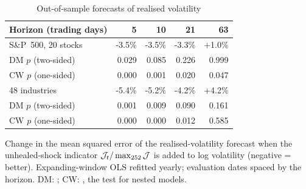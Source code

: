 \begin{table}[p]\centering\small
\caption{Out-of-sample forecasts of realised volatility}\label{tab:h7}
\begin{tabular}{@{}lrrrr@{}}\toprule
Horizon (trading days) & 5 & 10 & 21 & 63 \\\midrule
S\&P~500, 20 stocks & -3.5\% & -3.5\% & -3.3\% & +1.0\% \\
\quad DM $p$ (two-sided) & 0.029 & 0.085 & 0.226 & 0.999 \\
\quad CW $p$ (one-sided) & 0.000 & 0.001 & 0.020 & 0.047 \\
48 industries & -5.4\% & -5.2\% & -4.2\% & +4.2\% \\
\quad DM $p$ (two-sided) & 0.001 & 0.009 & 0.090 & 0.161 \\
\quad CW $p$ (one-sided) & 0.000 & 0.000 & 0.012 & 0.585 \\
\bottomrule\end{tabular}
\par\medskip\begin{minipage}{0.95\linewidth}\footnotesize
Change in the mean squared error of the realised-volatility forecast when the unhealed-shock indicator
$\mathcal{J}_t/\max_{252}\mathcal{J}$ is added to log volatility (negative = better). Expanding-window OLS refitted yearly; evaluation dates
spaced by the horizon. DM: \citet{dm1995}; CW: \citet{clarkwest2007}, the test for nested models.
\end{minipage}
\end{table}

